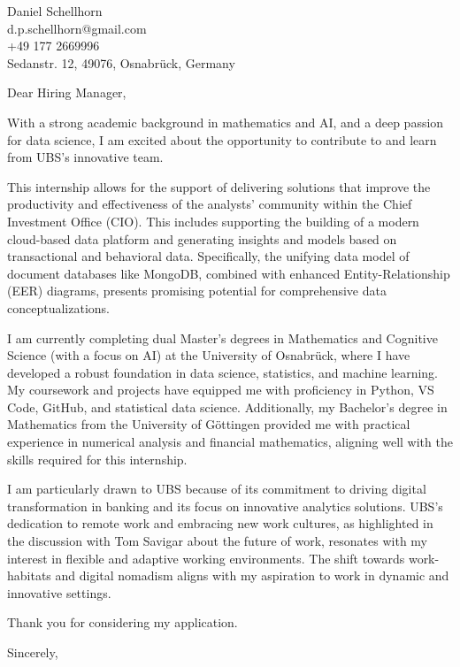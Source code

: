 \documentclass[12pt]{letter}
\begin{document}
\begin{letter}{Daniel Schellhorn \\ d.p.schellhorn@gmail.com \\ +49 177 2669996 \\ Sedanstr. 12, 49076, Osnabrück, Germany}

\opening{Dear Hiring Manager,}

With a strong academic background in mathematics and AI, and a deep passion for data science, I am excited about the opportunity to contribute to and learn from UBS’s innovative team.

This internship allows for the support of delivering solutions that improve the productivity and effectiveness of the analysts' community within the Chief Investment Office (CIO). This includes supporting the building of a modern cloud-based data platform and generating insights and models based on transactional and behavioral data. Specifically, the unifying data model of document databases like MongoDB, combined with enhanced Entity-Relationship (EER) diagrams, presents promising potential for comprehensive data conceptualizations.

I am currently completing dual Master’s degrees in Mathematics and Cognitive Science (with a focus on AI) at the University of Osnabrück, where I have developed a robust foundation in data science, statistics, and machine learning. My coursework and projects have equipped me with proficiency in Python, VS Code, GitHub, and statistical data science. Additionally, my Bachelor's degree in Mathematics from the University of Göttingen provided me with practical experience in numerical analysis and financial mathematics, aligning well with the skills required for this internship.

I am particularly drawn to UBS because of its commitment to driving digital transformation in banking and its focus on innovative analytics solutions. UBS’s dedication to remote work and embracing new work cultures, as highlighted in the discussion with Tom Savigar about the future of work, resonates with my interest in flexible and adaptive working environments. The shift towards work-habitats and digital nomadism aligns with my aspiration to work in dynamic and innovative settings.

Thank you for considering my application.

\closing{Sincerely,}

\end{letter}
\end{document}
